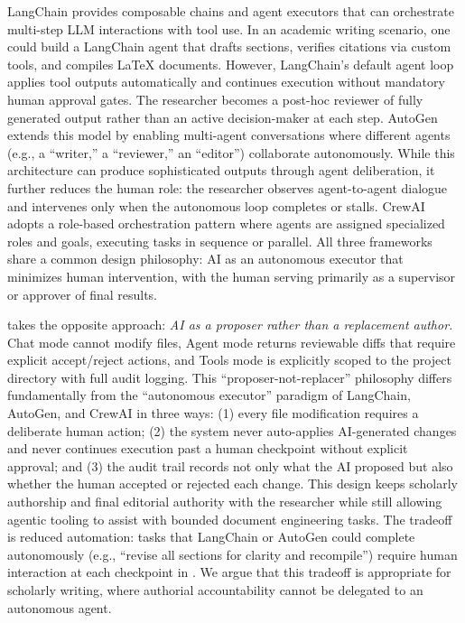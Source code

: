 LangChain provides composable chains and agent executors that can orchestrate
multi-step LLM interactions with tool use. In an academic writing scenario, one
could build a LangChain agent that drafts sections, verifies citations via
custom tools, and compiles \LaTeX{} documents. However, LangChain's default
agent loop applies tool outputs automatically and continues execution without
mandatory human approval gates. The researcher becomes a post-hoc reviewer of
fully generated output rather than an active decision-maker at each step.
AutoGen extends this model by enabling multi-agent conversations where
different agents (e.g., a ``writer,'' a ``reviewer,'' an ``editor'') collaborate
autonomously. While this architecture can produce sophisticated outputs through
agent deliberation, it further reduces the human role: the researcher observes
agent-to-agent dialogue and intervenes only when the autonomous loop completes
or stalls. CrewAI adopts a role-based orchestration pattern where agents are
assigned specialized roles and goals, executing tasks in sequence or parallel.
All three frameworks share a common design philosophy: AI as an autonomous
executor that minimizes human intervention, with the human serving primarily as
a supervisor or approver of final results.

\software{} takes the opposite approach: \emph{AI as a proposer rather than a
replacement author.} Chat mode cannot modify files, Agent mode returns
reviewable diffs that require explicit accept/reject actions, and Tools mode is
explicitly scoped to the project directory with full audit logging. This
``proposer-not-replacer'' philosophy differs fundamentally from the
``autonomous executor'' paradigm of LangChain, AutoGen, and CrewAI in three
ways: (1) every file modification requires a deliberate human action; (2) the
system never auto-applies AI-generated changes and never continues execution
past a human checkpoint without explicit approval; and (3) the audit trail
records not only what the AI proposed but also whether the human accepted or
rejected each change. This design keeps scholarly authorship and final editorial
authority with the researcher while still allowing agentic tooling to assist
with bounded document engineering tasks. The tradeoff is reduced automation:
tasks that LangChain or AutoGen could complete autonomously (e.g., ``revise all
sections for clarity and recompile'') require human interaction at each
checkpoint in \software{}. We argue that this tradeoff is appropriate for
scholarly writing, where authorial accountability cannot be delegated to an
autonomous agent.

